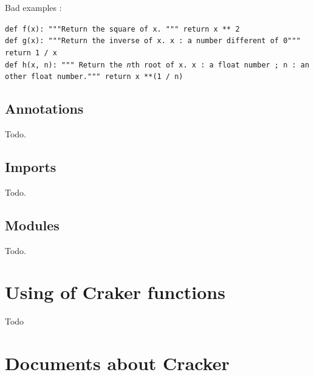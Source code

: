 \documentclass[a4paper,10pt]{report}
\begin{document}
   
   \noindent Bad examples :
   
   \texttt{def f(x): \newline
	   \indent \indent """Return the square of x. \newline
	   \indent \indent """ \newline \newline
	   \indent \indent return x ** 2} \\
  
   \texttt{def g(x): \newline
	   \indent \indent """Return the inverse of x. \newline
	   \indent \indent x : a number different of 0""" \newline \newline
	   \indent \indent return 1 / x} \\
   
   \texttt{def h(x, n): \newline
	   \indent \indent """\newline 
	   \indent \indent Return the \emph{n}th root of x. \newline \newline
	   \indent \indent x : a float number ; \newline
	   \indent \indent n : an other float number.""" \newline \newline
	   \indent \indent return x **(1 / n)}
  
  
  \section{Annotations}
   Todo.
  
  \section{Imports}
   Todo.
  
  \section{Modules}
   Todo.
  
  
  
 \chapter{Using of Craker functions}
  Todo
  
  
  
 \chapter{Documents about Cracker}
\end{document}

